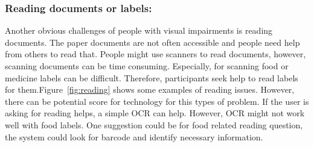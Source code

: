 \documentclass[sigconf]{acmart}
\begin{document}
\subsubsection{Reading documents or labels:} Another obvious challenges of people with visual impairments is reading documents. The paper documents are not often accessible and people need help from others to read that. People might use scanners to read documents, however, scanning documents can be time consuming. Especially, for scanning food or medicine labels can be difficult. Therefore, participants seek help to read labels for them.Figure~\ref{fig:reading} shows some examples of reading issues. However, there can be potential score for technology for this types of problem. If the user is asking for reading helps, a simple OCR can help. However, OCR might not work well with food labels. One suggestion could be for food related reading question, the system could look for barcode and identify necessary information.
\end{document}
